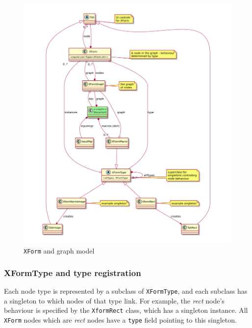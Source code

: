 \begin{figure}[ht]
\center
\includegraphics[width=6in]{xform.pdf}
\caption{\texttt{XForm} and graph model}
\label{xform.pdf}
\end{figure}

\subsubsection{XFormType and type registration}
\label{xformtype}
Each node type is represented by a subclass of \texttt{XFormType},
and each subclass has a singleton to which nodes of that type link.
For example, the \emph{rect} node's behaviour is specified by
the \texttt{XformRect} class, which has a singleton instance. All
\texttt{XForm} nodes which are \emph{rect} nodes have a \texttt{type} field
pointing to this singleton.

